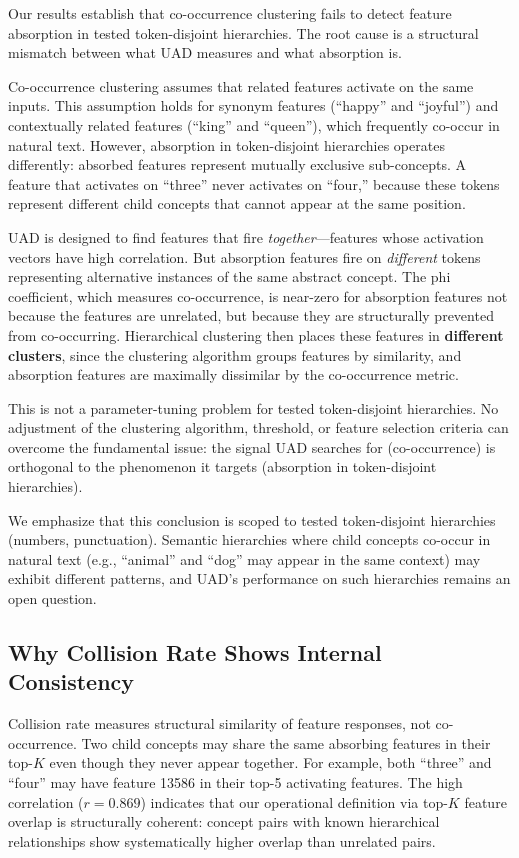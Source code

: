 \documentclass{article}
\begin{document}
Our results establish that co-occurrence clustering fails to detect feature absorption in tested token-disjoint hierarchies. The root cause is a structural mismatch between what UAD measures and what absorption is.

Co-occurrence clustering assumes that related features activate on the same inputs. This assumption holds for synonym features (``happy'' and ``joyful'') and contextually related features (``king'' and ``queen''), which frequently co-occur in natural text. However, absorption in token-disjoint hierarchies operates differently: absorbed features represent mutually exclusive sub-concepts. A feature that activates on ``three'' never activates on ``four,'' because these tokens represent different child concepts that cannot appear at the same position.

UAD is designed to find features that fire \emph{together}---features whose activation vectors have high correlation. But absorption features fire on \emph{different} tokens representing alternative instances of the same abstract concept. The phi coefficient, which measures co-occurrence, is near-zero for absorption features not because the features are unrelated, but because they are structurally prevented from co-occurring. Hierarchical clustering then places these features in \textbf{different clusters}, since the clustering algorithm groups features by similarity, and absorption features are maximally dissimilar by the co-occurrence metric.

This is not a parameter-tuning problem for tested token-disjoint hierarchies. No adjustment of the clustering algorithm, threshold, or feature selection criteria can overcome the fundamental issue: the signal UAD searches for (co-occurrence) is orthogonal to the phenomenon it targets (absorption in token-disjoint hierarchies).

We emphasize that this conclusion is scoped to tested token-disjoint hierarchies (numbers, punctuation). Semantic hierarchies where child concepts co-occur in natural text (e.g., ``animal'' and ``dog'' may appear in the same context) may exhibit different patterns, and UAD's performance on such hierarchies remains an open question.

\subsection{Why Collision Rate Shows Internal Consistency}

Collision rate measures structural similarity of feature responses, not co-occurrence. Two child concepts may share the same absorbing features in their top-$K$ even though they never appear together. For example, both ``three'' and ``four'' may have feature 13586 in their top-5 activating features. The high correlation ($r = 0.869$) indicates that our operational definition via top-$K$ feature overlap is structurally coherent: concept pairs with known hierarchical relationships show systematically higher overlap than unrelated pairs.
\end{document}
